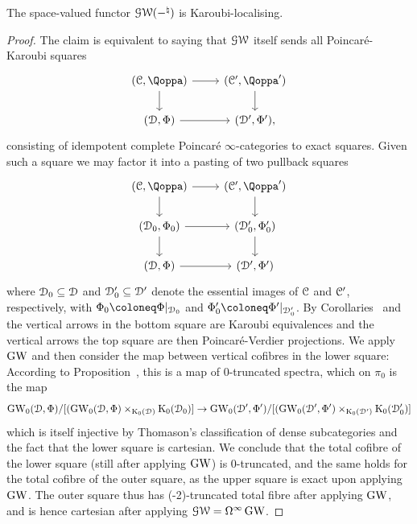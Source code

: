\begin{proposition}
\label{example:GWspace_Karoubi_localising}%
The space-valued functor $\operatorname{\mathcal{GW}}(-^{\natural})$ 
is Karoubi-localising.
\end{proposition}
\begin{proof}
The claim is equivalent to saying that $\operatorname{\mathcal{GW}}$ itself sends all Poincaré-Karoubi squares
\[
 \begin{tikzcd}
  (\C, \QF) \ar[r] \ar[d] & (\C', \QF') \ar[d]\\
  (\D, \QFD) \ar[r] & (\D', \QFD'),
 \end{tikzcd}
\]
consisting of idempotent complete Poincaré $\infty$-categories to exact squares. 
Given such a square we may factor it into a pasting of two pullback squares
\[
\begin{tikzcd}
  (\C, \QF) \ar[r] \ar[d] & (\C', \QF') \ar[d]\\
  (\D_0, \QFD_0) \ar[r] \ar[d] & (\D'_0, \QFD'_0) \ar[d]\\
  (\D, \QFD) \ar[r] & (\D', \QFD')
 \end{tikzcd}
\]
where $\mathcal{D}_0 \subseteq \mathcal{D}$ and $\mathcal{D}_0'\subseteq \mathcal{D}'$ denote the essential images of $\mathcal C$ and $\mathcal C'$, respectively, with $\QFD_0 \coloneq \QFD|_{\D_0}$ and $\QFD'_0 \coloneq \QFD'|_{\D'_0}$.
By Corollaries~ and  
the vertical arrows in the bottom square are Karoubi equivalences and the vertical arrows the top square are then Poincaré-Verdier projections.
We apply $\operatorname{GW}$ and then consider the map between vertical cofibres in the lower square: According to Proposition~, this is a map of
$0$-truncated spectra, which on $\pi_0$ is the map
\[
\operatorname{GW}_0(\mathcal{D},\Phi) / [(\operatorname{GW}_0(\mathcal{D},\Phi) \times_{\operatorname K_0(\mathcal{D})} \operatorname K_0(\mathcal{D}_0)] \to \operatorname{GW}_0(\mathcal{D}',\Phi') / [(\operatorname{GW}_0(\mathcal{D}',\Phi') \times_{\operatorname K_0(\mathcal{D}')} \operatorname K_0(\mathcal{D}_0')]
\]
which is itself injective by Thomason's classification of dense subcategories and the fact that the lower square is cartesian. %
We conclude that the total cofibre of the lower square (still after applying $\operatorname{GW}$) is 
0-truncated, and the same holds for the total cofibre of the outer square, as the upper square is exact upon applying $\operatorname{GW}$. The outer square thus has 
(-2)-truncated total fibre after applying $\operatorname{GW}$, and is hence cartesian after applying $\operatorname{\mathcal{GW}} = \Omega^{\infty}\operatorname{GW}$.
\end{proof}












